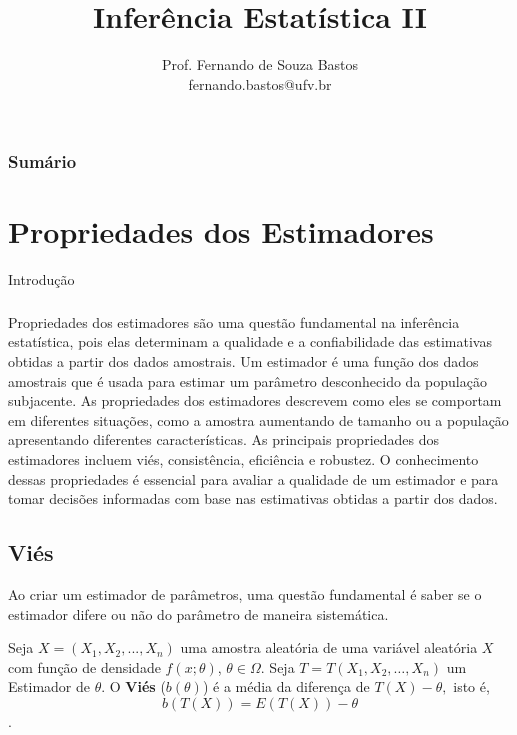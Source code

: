 \documentclass[12pt]{beamer}
\title{Inferência Estatística II}
\author{Prof. Fernando de Souza Bastos\texorpdfstring{\\ fernando.bastos@ufv.br}{}}
\institute{Departamento de Estatística\texorpdfstring{\\ Programa de Pós-Graduação em Estatística Aplicada e Biometria}\texorpdfstring{\\ Universidade Federal de Viçosa}{}\texorpdfstring{\\ Campus UFV - Viçosa}{}}
\date{}
\begin{document}

\frame{\titlepage}

\begin{frame}{}
\frametitle{\bf Sumário}
\tableofcontents
\end{frame}

\section{Propriedades dos Estimadores}
\begin{frame}{Introdução}
\frametitle{}
\begin{block}{}
\justifying
Propriedades dos estimadores são uma questão fundamental na inferência estatística, pois elas determinam a qualidade e a confiabilidade das estimativas obtidas a partir dos dados amostrais. Um estimador é uma função dos dados amostrais que é usada para estimar um parâmetro desconhecido da população subjacente. As propriedades dos estimadores descrevem como eles se comportam em diferentes situações, como a amostra aumentando de tamanho ou a população apresentando diferentes características. As principais propriedades dos estimadores incluem viés, consistência, eficiência e robustez. O conhecimento dessas propriedades é essencial para avaliar a qualidade de um estimador e para tomar decisões informadas com base nas estimativas obtidas a partir dos dados. 
\end{block}
\end{frame}

\subsection{Viés}
\begin{frame}{}
\begin{block}{}
\justifying
Ao criar um estimador de parâmetros, uma questão fundamental é saber se o estimador difere ou não do parâmetro de maneira sistemática.
\begin{definicao}\label{def1}
\justifying
Seja $X=(X_{1},X_{2},...,X_{n})$ uma amostra aleatória de uma variável aleatória $X$ com função de densidade $f(x;\theta)$, $\theta \in \Omega$. Seja $T = T(X_1, X_2, \dots, X_n)$ um Estimador de $\theta$. O \textbf{Viés} ($b(\theta)$) é a média da diferença de $T(X)-\theta,$ isto é, $$b(T(X))=E(T(X))-\theta$$.
\end{definicao}
\end{block}
\end{frame}
\end{document}
